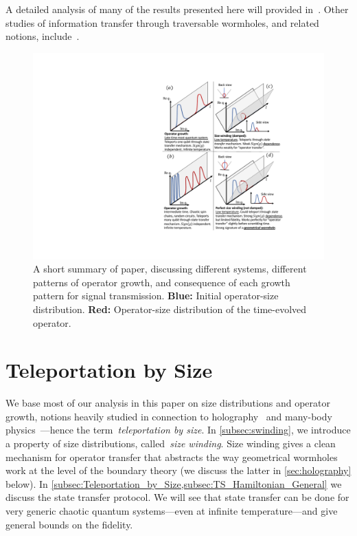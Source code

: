 \documentclass[aps,pra,reprint,floatfix,superscriptaddress, nofootinbib,longbibliography,onecolumn,notitlepage,12pt, tightenlines]{revtex4-1}
\begin{document}
A detailed analysis of many of the results presented here will provided in~\cite{longpaper}. Other studies of information transfer through traversable wormholes, and related notions, include~\cite{freivogel2019traversable,Yoshida2017}.

\begin{figure}
\includegraphics[width=10 cm]{043.pdf}
\caption{A short summary of paper, discussing different systems, different patterns of operator growth, and consequence of each growth pattern for signal transmission. {\bf Blue:} Initial operator-size distribution. {\bf Red:} Operator-size distribution of the time-evolved operator.}
\label{fig:Summary_of_everything}
\end{figure}


\section{Teleportation by Size}\label{sec:sizeandmomentum}
We base most of our analysis in this paper on size distributions and operator growth, notions heavily studied in connection to holography~\cite{susskind2019complexity,lin2019symmetries,qi2019quantum} and many-body physics~\cite{Nahum_2018,von_Keyserlingk_2018,Xu_2019}---hence the term~\emph{teleportation by size}.
In \cref{subsec:swinding}, we introduce a property of size distributions, called~\emph{size winding}.
Size winding gives a clean mechanism for operator transfer that abstracts the way geometrical wormholes work at the level of the boundary theory (we discuss the latter in \cref{sec:holography} below).
In \cref{subsec:Teleportation_by_Size,subsec:TS_Hamiltonian_General} we discuss the state transfer protocol.
We will see that state transfer can be done for very generic chaotic quantum systems---even at infinite temperature---and give general bounds on the fidelity.
\end{document}
